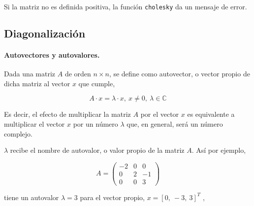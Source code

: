 \begin{paracol}{2}
Si la matriz no es definida positiva, la función \texttt{cholesky} da un mensaje de error.

\subsection{Diagonalización}\label{sec:diag}
\paragraph{Autovectores y autovalores.} Dada una matriz $A$ de orden $n\times n$, se define como autovector, o vector propio de dicha matriz al vector $x$ que cumple,
\end{paracol}
\begin{equation*}
A\cdot x =\lambda \cdot x, \  x\neq 0, \ \lambda \in \mathbb{C}
\end{equation*}
\begin{paracol}{2}
Es decir, el efecto de multiplicar la matriz $A$ por el vector $x$ es equivalente a multiplicar el vector $x$  por un número $\lambda$ que, en general, será un número complejo.

$\lambda$ recibe el nombre de autovalor, o valor propio de la matriz $A$. Así por ejemplo,
\end{paracol}
\begin{equation*}
A= \begin{pmatrix}
-2& 0& 0\\
0& 2 & -1\\
0& 0& 3
\end{pmatrix}
\end{equation*}

\begin{paracol}{2}
tiene un autovalor $\lambda=3$ para el vector propio, $x=[0,\  -3,\  3]^T$ ,
\end{paracol}

